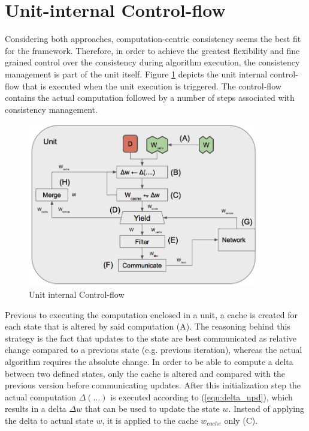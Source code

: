 \section{Unit-internal Control-flow}
Considering both approaches, computation-centric consistency seems the best fit for the framework.
Therefore, in order to achieve the greatest flexibility and fine grained control over the consistency during algorithm execution, the consistency management is part of the unit itself.
Figure \ref{fig:unit_internal_flow} depicts the unit internal control-flow that is executed when the unit execution is triggered.
The control-flow contains the actual computation followed by a number of steps associated with consistency management.
\begin{figure}[ht]
\centering
\includegraphics[width=0.9\textwidth]{img/unit_internal_flow.png}
\caption{Unit internal Control-flow}
\label{fig:unit_internal_flow}
\end{figure}
Previous to executing the computation enclosed in a unit, a cache is created for each state that is altered by said computation (A).
The reasoning behind this strategy is the fact that updates to the state are best communicated as relative change compared to a previous state (e.g. previous iteration), whereas the actual algorithm requires the absolute change.
In order to be able to compute a delta between two defined states, only the cache is altered and compared with the previous version before communicating updates.
After this initialization step the actual computation $\Delta(\ldots)$ is executed according to (\ref{eqn:delta_upd}), which results in a delta $\Delta w$ that can be used to update the state $w$.
Instead of applying the delta to actual state $w$, it is applied to the cache $w_{cache}$ only (C).
